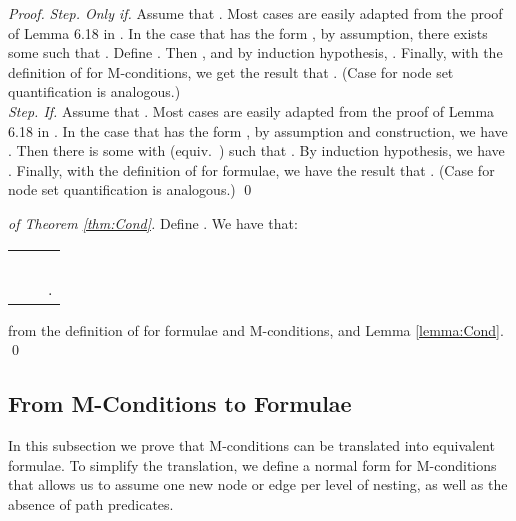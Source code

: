 \documentclass{llncs}
\begin{document}
\begin{proof}
		\noindent \emph{Step. Only if.} Assume that . Most cases are easily adapted from the proof of Lemma 6.18 in \cite{Poskitt13a}. In the case that  has the form , by assumption, there exists some  such that . Define . Then , and by induction hypothesis, . Finally, with the definition of  for M-conditions, we get the result that . (Case for node set quantification is analogous.)  \\
		
		\noindent \emph{Step. If.} Assume that . Most cases are easily adapted from the proof of Lemma 6.18 in \cite{Poskitt13a}. In the case that  has the form , by assumption and construction, we have . Then there is some  with  (equiv.\ ) such that . By induction hypothesis, we have . Finally, with the definition of  for formulae, we have the result that . (Case for node set quantification is analogous.)		
		\qed
	\end{proof}
	
	\begin{proof}[of Theorem \ref{thm:Cond}]
		Define . We have that:
		
		\begin{center}\begin{tabular}{r c l}
			 &&  \\
			&&  \\
			&&  \\
			&&  \\
			&& .
		\end{tabular}\end{center}
		
		\noindent from the definition of  for formulae and M-conditions, and Lemma \ref{lemma:Cond}.
		\qed
	\end{proof}
	
	
	
	
	
	
	
	
	
	
	
	
	\subsection{From M-Conditions to Formulae}
	
	In this subsection we prove that M-conditions can be translated into equivalent formulae. To simplify the translation, we define a normal form for M-conditions that allows us to assume one new node or edge per level of nesting, as well as the absence of path predicates.
	
\end{document}
